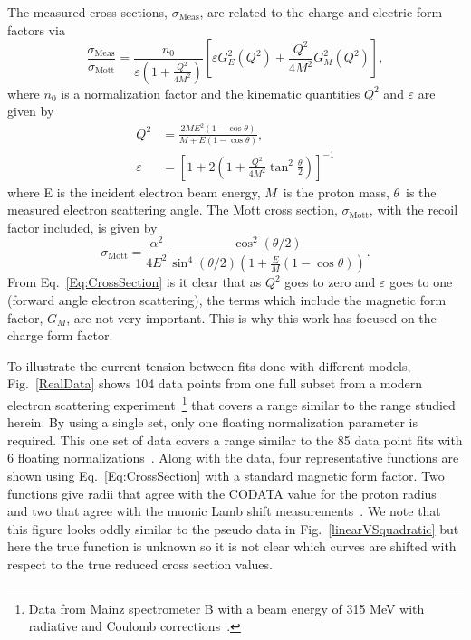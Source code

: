\documentclass[10pt,aps,prc,twocolumn]{revtex4-1}
\begin{document}
The measured cross sections, $\sigma_{\mathrm{Meas}}$,  are related to the charge and electric form factors via 
\begin{equation}
\frac{\sigma_{\text{Meas}}}{\sigma_{\text{Mott}}} = \frac{n_0}{\varepsilon (1 + \frac{Q^2}{4M^2})} \left[\varepsilon G_E^2 (Q^2) + \frac{Q^2}{4M^2} G_M^2 (Q^2)\right],
\label{Eq:CrossSection}
\end{equation}
where $n_0$ is a normalization factor and the kinematic quantities $Q^2$ and $\varepsilon$ are given by
\begin{align}
Q^2 & = \frac{2M E^2 (1 - \cos{\theta})}{M + E (1 - \cos{\theta})}, \\
\varepsilon & = \left[1 + 2(1 + \frac{Q^2}{4M^2}  \tan^2{\frac{\theta}{2}})\right]^{-1}
\end{align}
where E is the incident electron beam energy, $M$~is the proton mass, $\theta$~is the measured electron scattering angle. 
The Mott cross section, $\sigma_{\text{Mott}}$, with the recoil factor included, is given by
\begin{equation}
\sigma_{\text{Mott}}  = \frac{\alpha^2}{4 E^2} \frac{\cos^2{(\theta / 2)}}{\sin^4{(\theta / 2)} ( 1 + \frac{E}{M} (1 - \cos{\theta}))}.
\end{equation}
From Eq.~\ref{Eq:CrossSection} is it clear that as $Q^2$ goes to zero and $\varepsilon$ goes to one (forward angle electron scattering), 
the terms which include the  magnetic form factor, $G_M$, are not very important. This is why this work has
focused on the charge form factor.

To illustrate the current tension between fits done with different models, Fig.~\ref{RealData} shows 
104 data points from one full subset from a modern electron scattering 
experiment~\footnote{Data from Mainz spectrometer B with a beam energy of 315 MeV with radiative and Coulomb corrections~\cite{Bernauer:2013tpr}.} 
that covers a range similar to the range studied herein.  By using a single set, only one floating normalization
parameter is required.
This one set of data covers a range similar to the 85 data point fits with 6 floating normalizations~\cite{Rosenfelder:1999cd,Hill:2010yb}.
Along with the data, four representative functions are shown using Eq.~\ref{Eq:CrossSection} with a standard magnetic form factor.
Two functions give radii that agree with the CODATA value for the proton
radius~\cite{Bernauer:2013tpr,Ye:2017gyb} and two that agree with the muonic Lamb shift measurements~\cite{Higinbotham:2015rja,Griffioen:2015hta}.
We note that this figure looks oddly similar to the pseudo data in Fig.~\ref{linearVSquadratic} but here the true function is unknown 
so it is not clear which curves are shifted with respect to the true reduced cross section values.
\end{document}
